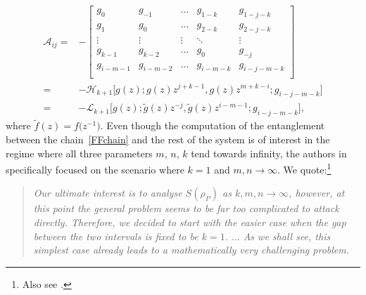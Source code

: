 \documentclass[10pt,a4paper]{amsart}
\numberwithin{equation}{section}
\begin{document}
	\begin{align*}%
			\mathscr{A}_{ij} ={}& -\begin{bmatrix}
				g_0 & g_{-1} & \dots & g_{1-k} & g_{1-j-k} \\
				g_1 & g_0 & \dots & g_{2-k} & g_{2-j-k} \\
				\vdots & \vdots & \vdots & \ddots & \vdots \\
				g_{k-1} & g_{k-2} & \dots & g_0 & g_{-j} \\
				g_{i-m-1} & g_{i-m-2} & \dots & g_{i-m-k} & g_{i-j-m-k} \\
			\end{bmatrix} \\ ={}& - \mathscr{H}_{k+1} \big[g(z); g(z) z^{j+k-1}, g(z) z^{m+k-i}; g_{i-j-m-k} \big] \\ ={}&
			- \mathscr{L}_{k+1} \big[g(z); \tilde{g}(z) z^{-j}, \tilde{g}(z) z^{i-m-1}; g_{i-j-m-k} \big],
	\end{align*}
	where $\tilde{f}(z)\! =\! f\big(z^{-1}\big)$. Even though the computation of the entanglement between the chain~\eqref{FFchain} and the rest of the system is of interest in the regime where all three parameters $m$, $n$, $k$ tend towards infinity, the authors in \cite{BGIKMMV} specifically focused on the scenario where $k=1$ and $m,n \to \infty$. We quote:\footnote{Also see \cite[Remark 1 in Section 3]{BGIKMMV}.}
\begin{quote}
		\textit{Our ultimate interest is to analyse $S(\rho_P)$ as $k,m,n\to\infty$, however, at this point the general problem seems to be far too complicated to attack directly. Therefore, we decided to start with the easier case when the gap between the two intervals is fixed to be $k=1$. $\dots$ As we shall see, this simplest case already leads to a mathematically very challenging problem.}
	\end{quote}
	
\end{document}
